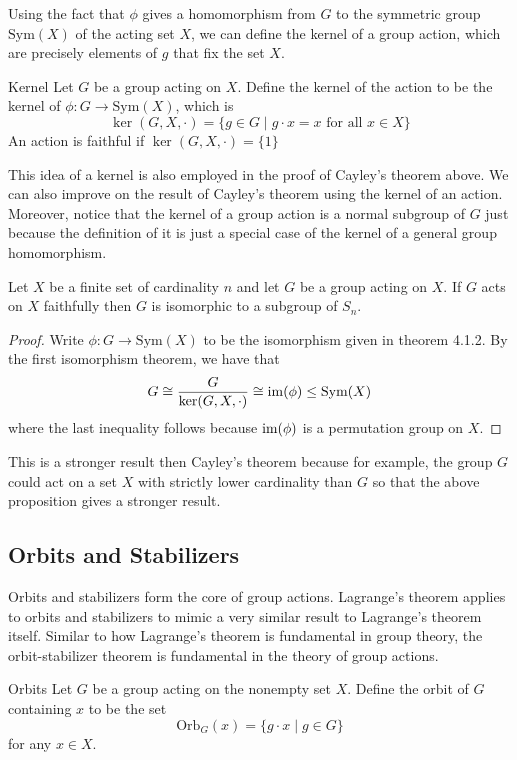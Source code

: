 \documentclass[a4paper]{article}
\begin{document}
Using the fact that $\phi$ gives a homomorphism from $G$ to the symmetric group $\text{Sym}(X)$ of the acting set $X$, we can define the kernel of a group action, which are precisely elements of $g$ that fix the set $X$. 

\begin{defn}{Kernel}{} Let $G$ be a group acting on $X$. Define the kernel of the action to be the kernel of $\phi:G\to\text{Sym}(X)$, which is $$\ker(G,X,\cdot)=\{g\in G\;|\;g\cdot x=x\text{ for all }x\in X\}$$ An action is faithful if $\ker(G,X,\cdot)=\{1\}$
\end{defn}

This idea of a kernel is also employed in the proof of Cayley's theorem above. We can also improve on the result of Cayley's theorem using the kernel of an action. Moreover, notice that the kernel of a group action is a normal subgroup of $G$ just because the definition of it is just a special case of the kernel of a general group homomorphism. 

\begin{prp}{}{} Let $X$ be a finite set of cardinality $n$ and let $G$ be a group acting on $X$. If $G$ acts on $X$ faithfully then $G$ is isomorphic to a subgroup of $S_n$. 
\begin{proof}
Write $\phi:G\to\text{Sym}(X)$ to be the isomorphism given in theorem 4.1.2. By the first isomorphism theorem, we have that $$G\cong\frac{G}{\ker(G,X,\cdot)}\cong\operatorname{im}(\phi)\leq\text{Sym}(X)$$ where the last inequality follows because $\operatorname{im}(\phi)$ is a permutation group on $X$. 
\end{proof}
\end{prp}

This is a stronger result then Cayley's theorem because for example, the group $G$ could act on a set $X$ with strictly lower cardinality than $G$ so that the above proposition gives a stronger result. 

\subsection{Orbits and Stabilizers}
Orbits and stabilizers form the core of group actions. Lagrange's theorem applies to orbits and stabilizers to mimic a very similar result to Lagrange's theorem itself. Similar to how Lagrange's theorem is fundamental in group theory, the orbit-stabilizer theorem is fundamental in the theory of group actions. 

\begin{defn}{Orbits}{} Let $G$ be a group acting on the nonempty set $X$. Define the orbit of $G$ containing $x$ to be the set $$\text{Orb}_G(x)=\{g\cdot x\;|\; g\in G\}$$ for any $x\in X$. 
\end{defn}
\end{document}
